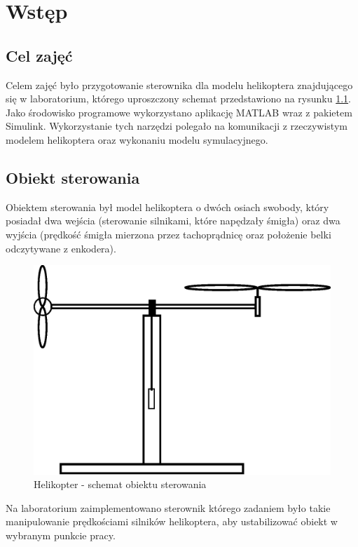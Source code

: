 \chapter{Wstęp}

\section{Cel zajęć}

Celem zajęć było przygotowanie sterownika dla modelu helikoptera znajdującego się w laboratorium, którego uproszczony schemat przedstawiono na rysunku \ref{heli_model}. Jako środowisko programowe wykorzystano aplikację MATLAB wraz z pakietem Simulink. Wykorzystanie tych narzędzi polegało na komunikacji z rzeczywistym modelem helikoptera oraz wykonaniu modelu symulacyjnego.

\section{Obiekt sterowania}

Obiektem sterowania był model helikoptera o dwóch osiach swobody, który posiadał dwa wejścia (sterowanie silnikami, które napędzały śmigła) oraz dwa wyjścia (prędkość śmigła mierzona przez tachoprądnicę oraz położenie belki odczytywane z enkodera).


\begin{figure}[h!]
	\centering
	\includegraphics[scale = 0.6]{fig/model_helikoptera.eps}
	\caption		
	{Helikopter - schemat obiektu sterowania}
	\label{heli_model}
\end{figure} 

Na laboratorium zaimplementowano sterownik którego zadaniem było takie manipulowanie prędkościami silników helikoptera, aby ustabilizować obiekt w wybranym punkcie pracy. 

